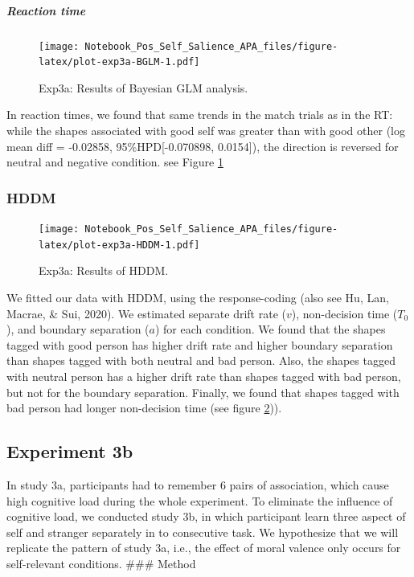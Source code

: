 \documentclass[
  english,
  man]{apa6}
\let\oldsubparagraph\subparagraph
\renewcommand{\subparagraph}[1]{\oldsubparagraph{#1}\mbox{}}
\begin{document}
\hypertarget{reaction-time-5}{%
\subparagraph{Reaction time}\label{reaction-time-5}}

\begin{figure}
\centering
\texttt{[image: Notebook\_Pos\_Self\_Salience\_APA\_files/figure-latex/plot-exp3a-BGLM-1.pdf]}
\caption{\label{fig:plot-exp3a-BGLM}Exp3a: Results of Bayesian GLM analysis.}
\end{figure}

In reaction times, we found that same trends in the match trials as in the RT: while the shapes associated with good self was greater than with good other (log mean diff = -0.02858, 95\%HPD{[}-0.070898, 0.0154{]}), the direction is reversed for neutral and negative condition. see Figure \ref{fig:plot-exp3a-BGLM}

\hypertarget{hddm-5}{%
\subsubsection{HDDM}\label{hddm-5}}

\begin{figure}
\centering
\texttt{[image: Notebook\_Pos\_Self\_Salience\_APA\_files/figure-latex/plot-exp3a-HDDM-1.pdf]}
\caption{\label{fig:plot-exp3a-HDDM}Exp3a: Results of HDDM.}
\end{figure}

We fitted our data with HDDM, using the response-coding (also see Hu, Lan, Macrae, \& Sui, 2020). We estimated separate drift rate (\(v\)), non-decision time (\(T_{0}\)), and boundary separation (\(a\)) for each condition. We found that the shapes tagged with good person has higher drift rate and higher boundary separation than shapes tagged with both neutral and bad person. Also, the shapes tagged with neutral person has a higher drift rate than shapes tagged with bad person, but not for the boundary separation. Finally, we found that shapes tagged with bad person had longer non-decision time (see figure \ref{fig:plot-exp3a-HDDM})).

\hypertarget{experiment-3b}{%
\subsection{Experiment 3b}\label{experiment-3b}}

In study 3a, participants had to remember 6 pairs of association, which cause high cognitive load during the whole experiment. To eliminate the influence of cognitive load, we conducted study 3b, in which participant learn three aspect of self and stranger separately in to consecutive task. We hypothesize that we will replicate the pattern of study 3a, i.e., the effect of moral valence only occurs for self-relevant conditions.
\#\#\# Method
\end{document}

